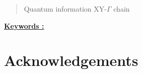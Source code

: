 \pagestyle{romanstyle}
\begin{abstract}
	\lipsum[1] %

    Quantum information XY-$\Gamma$ chain 

\end{abstract}

\underline{\textbf{Keywords :}}

\newpage
\section*{Acknowledgements}
\newpage



\newpage

		
\tableofcontents


\newpage

		\listoffigures

\newpage
		
		\listoftables

